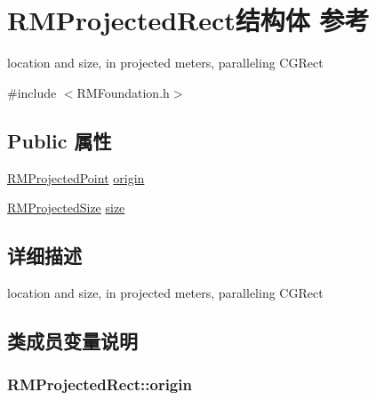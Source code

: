 \hypertarget{struct_r_m_projected_rect}{\section{R\-M\-Projected\-Rect结构体 参考}
\label{struct_r_m_projected_rect}
}


location and size, in projected meters, paralleling C\-G\-Rect  




{\ttfamily \#include $<$R\-M\-Foundation.\-h$>$}

\subsection*{Public 属性}
\begin{DoxyCompactItemize}
\item 
\hyperlink{struct_r_m_projected_point}{R\-M\-Projected\-Point} \hyperlink{struct_r_m_projected_rect_aae440953359d3aba5d6f11930e918373}{origin}
\item 
\hyperlink{struct_r_m_projected_size}{R\-M\-Projected\-Size} \hyperlink{struct_r_m_projected_rect_a5714e79da5f5fc7530595b268f47dbb6}{size}
\end{DoxyCompactItemize}


\subsection{详细描述}
location and size, in projected meters, paralleling C\-G\-Rect 

\subsection{类成员变量说明}
\hypertarget{struct_r_m_projected_rect_aae440953359d3aba5d6f11930e918373}{
\subsubsection[{origin}]{ R\-M\-Projected\-Rect\-::origin}}\label{struct_r_m_projected_rect_aae440953359d3aba5d6f11930e918373}


